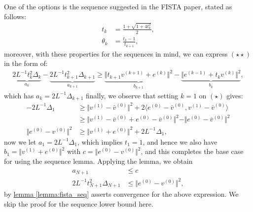 \documentclass[]{article}
\theoremstyle{definition}
\begin{document}
        One of the options is the sequence suggested in the FISTA paper, stated as follows: 
        \begin{align*}
            t_k &= \frac{1 + \sqrt{1 + 4t_k^2}}{2}, 
            \\
            \theta_k &= \frac{t_k - 1}{t_{k + 1}}, 
            \tag{$\star \star *$}
        \end{align*}
        moreover, with these properties for the sequences in mind, we can express $(\star\star)$ in the form of:
        \begin{align*}
            \underbrace{2L^{-1}t_k^2\Delta_k}_{a_k} - \underbrace{2L^{-1}t_{k + 1}^2\Delta_{k + 1}}_{a_{k + 1}}
            \ge 
            \underbrace{\Vert t_{k + 1}v^{(k + 1)} + e^{(k)}\Vert^2}_{b_{k + 1}}
            - 
            \underbrace{\Vert e^{(k - 1)} + t_k  v^{(k)} \Vert^2}_{b_{k}}, 
        \end{align*}
        which has $a_k = 2L^{-1}\Delta_{k + 1}$ finally, we observe that setting $k = 1$ on $(\star)$ gives: 
        \begin{align*}
            -2L^{-1}  \Delta_1
            & \ge 
            \Vert v^{(1)} - \bar v^{(0)}\Vert^2 + 
            2\langle e^{(0)} - \bar v^{(0)}, v^{(1)} - \bar v^{(0)}\rangle
            \\
            &\ge
            \Vert 
                v^{(1)} - \bar v^{(0)}
                + 
                e^{(0)} - \bar v^{(0)}
            \Vert^2
            - 
            \Vert 
                e^{(0)} - \bar v^{(0)}
            \Vert^2
            \\
            \Vert e^{(0)} - v^{(0)}\Vert^2
            & \ge 
            \Vert v^{(1)} + e^{(0)}\Vert^2 + 2L^{-1}\Delta_1, 
        \end{align*}
        now we let $a_1 = 2L^{-1}\Delta_1$, which implies $t_1 = 1$, and hence we also have $b_1 = \Vert v^{(1)} + e^{(0)}\Vert^2$ with $c = \Vert e^{(0)} - v^{(0)}\Vert^2$, and this completes the base case for using the sequence lemma. Applying the lemma, we obtain 
        \begin{align*}
            a_{N + 1} &\le c
            \\
            2L^{-1}t_{N + 1}^2\Delta_{N + 1} &\le \Vert e^{(0)} - v^{(0)}\Vert^2, 
        \end{align*}
        by \hyperref[lemma:fista_seq]{lemma \ref*{lemma:fista_seq}} asserts convergence for the above expression. We skip the proof for the sequence lower bound here. 



\end{document}
